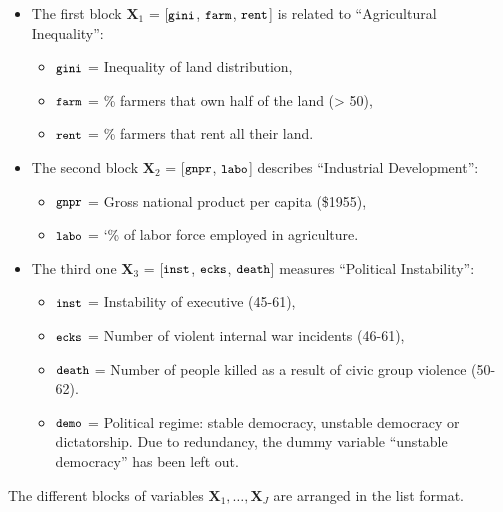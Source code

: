 \documentclass[
]{jss}
\providecommand{\tightlist}{%
  \setlength{\itemsep}{0pt}\setlength{\parskip}{0pt}}
\begin{document}
\begin{itemize}
\tightlist
\item
  The first block \(\mathbf{X}_1\) = {[}\(\small{\texttt{gini}}\),
  \(\small{\texttt{farm}}\), \(\small{\texttt{rent}}\){]} is related to
  ``Agricultural Inequality'':

  \begin{itemize}
  \tightlist
  \item
    \(\small{\texttt{gini}}\) = Inequality of land distribution,
  \item
    \(\small{\texttt{farm}}\) = \% farmers that own half of the land
    (\textgreater{} 50),
  \item
    \(\small{\texttt{rent}}\) = \% farmers that rent all their land.
  \end{itemize}
\item
  The second block \(\mathbf{X}_2\) = {[}\(\small{\texttt{gnpr}}\),
  \(\small{\texttt{labo}}\){]} describes ``Industrial Development'':

  \begin{itemize}
  \tightlist
  \item
    \(\small{\texttt{gnpr}}\) = Gross national product per capita
    (\$1955),
  \item
    \(\small{\texttt{labo}}\) = `\% of labor force employed in
    agriculture.
  \end{itemize}
\item
  The third one \(\mathbf{X}_3\) = {[}\(\small{\texttt{inst}}\),
  \(\small{\texttt{ecks}}\), \(\small{\texttt{death}}\){]} measures
  ``Political Instability'':

  \begin{itemize}
  \tightlist
  \item
    \(\small{\texttt{inst}}\) = Instability of executive (45-61),
  \item
    \(\small{\texttt{ecks}}\) = Number of violent internal war incidents
    (46-61),
  \item
    \(\small{\texttt{death}}\) = Number of people killed as a result of
    civic group violence (50-62).
  \item
    \(\small{\texttt{demo}}\) = Political regime: stable democracy,
    unstable democracy or dictatorship. Due to redundancy, the dummy
    variable ``unstable democracy'' has been left out.
  \end{itemize}
\end{itemize}

The different blocks of variables \(\mathbf X_1, \ldots, \mathbf X_J\)
are arranged in the list format.
\end{document}
